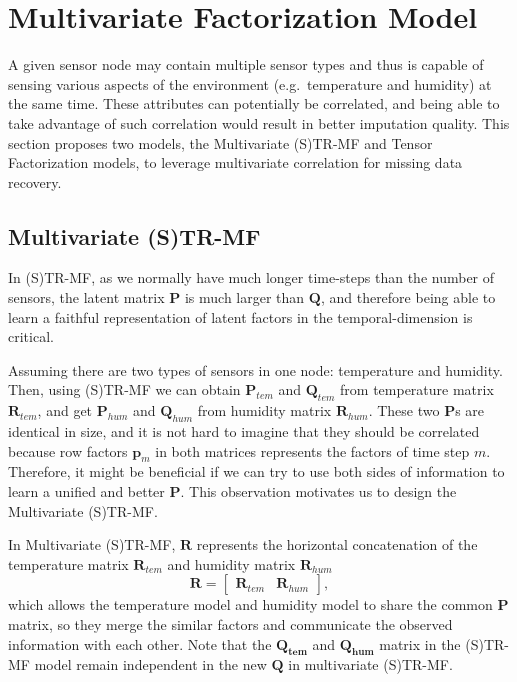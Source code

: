 
\section{Multivariate Factorization Model} \label{sec:tf}
A given sensor node may contain multiple sensor types and thus is capable of sensing various aspects of the environment (e.g.\ temperature and humidity) at the same time.
These attributes can potentially be correlated, and being able to take advantage of such correlation would result in better imputation quality.
This section proposes two models, the Multivariate (S)TR-MF and Tensor Factorization models, to leverage multivariate correlation for missing data recovery.

\subsection{Multivariate (S)TR-MF} %
In (S)TR-MF, as we normally have much longer time-steps than the number of sensors, the latent matrix $\mathbf{P}$ is much larger than $\mathbf{Q}$, and therefore being able to learn a faithful representation of latent factors in the temporal-dimension is critical. 

Assuming there are two types of sensors in one node: temperature and humidity. Then, using (S)TR-MF we can obtain $\mathbf{P}_{tem}$ and $\mathbf{Q}_{tem}$ from temperature matrix $\mathbf{R}_{tem}$, and get $\mathbf{P}_{hum}$ and $\mathbf{Q}_{hum}$ from humidity matrix $\mathbf{R}_{hum}$. These two $\mathbf{P}$s are identical in size, and it is not hard to imagine that they should be correlated because row factors $\mathbf{p}_m$ in both matrices represents the factors of time step $m$. Therefore, it might be beneficial if we can try to use both sides of information to learn a unified and better $\mathbf{P}$.
This observation motivates us to design the Multivariate (S)TR-MF.

In Multivariate (S)TR-MF, $\mathbf{R}$ represents the horizontal concatenation of the temperature matrix $\mathbf{R}_{tem}$ and humidity matrix $\mathbf{R}_{hum}$
\begin{equation*} \mathbf{R} = \begin{bmatrix}\mathbf{R}_{tem} & \mathbf{R}_{hum} \end{bmatrix}, \end{equation*}
which allows the temperature model and humidity model to share the common $\mathbf{P}$ matrix, so they merge the similar factors and communicate the observed information with each other. Note that the $\mathbf{Q_{tem}}$ and $\mathbf{Q_{hum}}$ matrix in the (S)TR-MF model remain independent in the new $\mathbf{Q}$ in multivariate (S)TR-MF.

